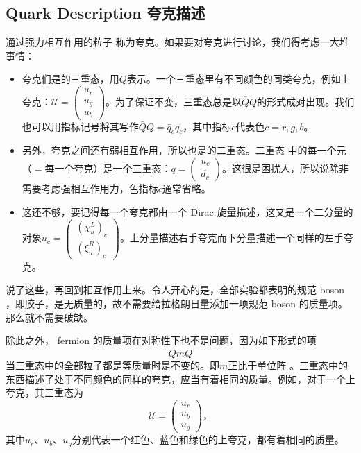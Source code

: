 \subsection[夸克描述]{Quark Description \quad 夸克描述}\label{sec7.8.2}
通过强力相互作用的\spint 粒子%
%
称为夸克。如果要对夸克进行讨论，我们得考虑一大堆事情：
\begin{itemize}
\item 夸克们是\suth 的三重态，用$Q$表示。一个三重态里有不同颜色的同类夸克，例如上夸克：${\mathcal U}= \begin{pmatrix}
u_r \\ u_g \\ u_b
\end{pmatrix}$。为了保证\suth 不变，三重态总是以$\bar{Q}Q$的形式成对出现。我们也可以用指标记号将其写作$\bar{Q}Q=\bar{q}_cq_c$，其中指标$c$代表色$c=r,g,b$。
\item 另外，夸克之间还有弱相互作用，所以也是\sutw 的二重态。二重态%
%
中的每一个元（$=$每一个夸克）是一个三重态：$q= \begin{pmatrix}
u_c \\ d_c
\end{pmatrix}$。这很是困扰人，所以说除非需要考虑强相互作用力，色指标$c$通常省略。
\item 这还不够，要记得每一个夸克都由一个 Dirac 旋量描述，这又是一个二分量的对象$u_c= \begin{pmatrix}
(\chi_u^L)_c \\ (\xi_u^R)_c
\end{pmatrix}$。上分量描述右手夸克而下分量描述一个同样的左手夸克。
\end{itemize}

说了这些，再回到\suth 相互作用上来。令人开心的是，全部实验都表明\suth 的规范 boson ，即胶子，是无质量的，故不需要给拉格朗日量添加一项规范 boson 的质量项。那么\suth 就不需要破缺。

除此之外， fermion 的质量项在\suth 对称性下也不是问题，因为如下形式的项
\begin{equation}
\bar{Q}mQ
\end{equation}
当三重态中的全部粒子都是等质量时是\suth 不变的。即$m$正比于单位阵%
%
。三重态中的东西描述了处于不同颜色的同样的夸克，应当有着相同的质量。例如，对于一个上夸克，其三重态为
\begin{equation}
{\mathcal U} = \begin{pmatrix}
u_r \\ u_b \\ u_g
\end{pmatrix}\text{，}
\end{equation}
其中$u_r$、$u_b$、$u_g$分别代表一个红色、蓝色和绿色的上夸克，都有着相同的质量。

